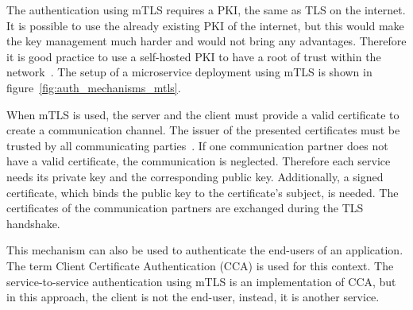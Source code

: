 The authentication using mTLS requires a PKI, the same as TLS on the internet.
It is possible to use the already existing PKI of the internet, but this would make the key management much harder and would not bring any advantages.
Therefore it is good practice to use a self-hosted PKI to have a root of trust within the network~\cite{dias2020microservices}.
The setup of a microservice deployment using mTLS is shown in figure~\ref{fig:auth_mechanisms_mtls}.

When mTLS is used, the server and the client must provide a valid certificate to create a communication channel.
The issuer of the presented certificates must be trusted by all communicating parties~\cite{dias2020microservices}.
If one communication partner does not have a valid certificate, the communication is neglected.
Therefore each service needs its private key and the corresponding public key.
Additionally, a signed certificate, which binds the public key to the certificate's subject, is needed.
The certificates of the communication partners are exchanged during the TLS handshake.

This mechanism can also be used to authenticate the end-users of an application.
The term Client Certificate Authentication (CCA) is used for this context.
The service-to-service authentication using mTLS is an implementation of CCA, but in this approach, the client is not the end-user, instead, it is another service.

